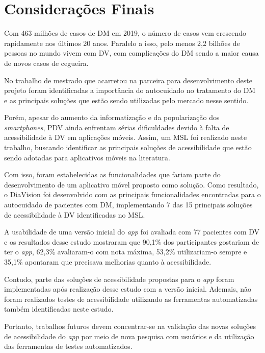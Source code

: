\chapter{Considerações Finais}
\label{ch:conclusion}

Com 463 milhões de casos de DM em 2019, o número de casos vem crescendo rapidamente nos últimos 20 anos.
Paralelo a isso, pelo menos 2,2 bilhões de pessoas no mundo vivem com DV\@, com complicações do DM sendo
a maior causa de novos casos de cegueira.

No trabalho de mestrado que acarretou na parceira para desenvolvimento deste projeto foram identificadas a importância
do autocuidado no tratamento do DM e as principais soluções que estão sendo utilizadas pelo mercado nesse sentido.

Porém, apesar do aumento da informatização e da popularização dos \emph{smartphones},
PDV ainda enfrentam sérias dificuldades devido à falta de acessibilidade à DV em aplicações móveis. Assim, um MSL foi realizado
neste trabalho, buscando identificar as principais soluções de acessibilidade que estão sendo adotadas para
aplicativos móveis na literatura. 

Com isso, foram estabelecidas as funcionalidades que fariam parte do desenvolvimento de um aplicativo
móvel proposto como solução. Como resultado, o DiaVision foi desenvolvido com as principais
funcionalidades encontradas para o autocuidado de pacientes com DM, implementando 7 das 15 principais soluções
de acessibilidade à DV identificadas no MSL\@.

A usabilidade de uma versão inicial do \emph{app} foi avaliada com 77 pacientes com DV e os resultados
desse estudo mostraram que 90,1\% dos participantes gostariam de ter o \emph{app}, 62,3\% avaliaram-o com nota
máxima, 53,2\% utilizariam-o sempre e 35,1\% apontaram que precisava melhorias quanto à acessibilidade.

Contudo, parte das soluções de acessibilidade propostas para o \emph{app} foram implementadas após realização
desse estudo com a versão inicial. Ademais, não foram realizados testes de acessibilidade utilizando
as ferramentas automatizadas também identificadas neste estudo.

Portanto, trabalhos futuros devem concentrar-se na validação das novas soluções de acessibilidade do \emph{app}
por meio de nova pesquisa com usuários e da utilização das ferramentas de testes automatizados.